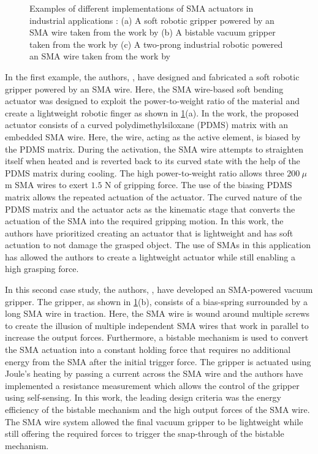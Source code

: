 \begin{figure}[h]
    \centering
    
    \caption[Examples of different implementations of SMA actuators in industrial applications]{Examples of different implementations of SMA actuators in industrial applications : (a) A soft robotic gripper powered by an SMA wire taken from the work by \cite{rodrigueCurvedShapeMemory2017a} (b) A bistable vacuum gripper taken from the work by \cite{motzkiEnergyefficientSMAVacuum2016} (c) A two-prong industrial robotic powered an SMA wire taken from the work by \cite{luNovelDesignParallel2019}}
    \label{fig:industrial-examples}
\end{figure}

In the first example, the authors, \cite{rodrigueCurvedShapeMemory2017a}, have designed and fabricated a soft robotic gripper powered by an SMA wire. Here, the SMA wire-based soft bending actuator was designed to exploit the power-to-weight ratio of the material and create a lightweight robotic finger as shown in \cref{fig:industrial-examples}(a). In the work, the proposed actuator consists of a curved polydimethylsiloxane (PDMS) matrix with an embedded SMA wire. Here, the wire, acting as the active element, is biased by the PDMS matrix. During the activation, the SMA wire attempts to straighten itself when heated and is reverted back to its curved state with the help of the PDMS matrix during cooling. The high power-to-weight ratio allows three $200~\mu$m SMA wires to exert $1.5$ N of gripping force. The use of the biasing PDMS matrix allows the repeated actuation of the actuator. The curved nature of the PDMS matrix and the actuator acts as the kinematic stage that converts the actuation of the SMA into the required gripping motion. In this work, the authors have prioritized creating an actuator that is lightweight and has soft actuation to not damage the grasped object. The use of SMAs in this application has allowed the authors to create a lightweight actuator while still enabling a high grasping force.

In this second case study, the authors, \cite{motzkiEnergyefficientSMAVacuum2016}, have developed an SMA-powered vacuum gripper. The gripper, as shown in \cref{fig:industrial-examples}(b), consists of a bias-spring surrounded by a long SMA wire in traction. Here, the SMA wire is wound around multiple screws to create the illusion of multiple independent SMA wires that work in parallel to increase the output forces. Furthermore, a bistable mechanism is used to convert the SMA actuation into a constant holding force that requires no additional energy from the SMA after the initial trigger force. The gripper is actuated using Joule's heating by passing a current across the SMA wire and the authors have implemented a resistance measurement which allows the control of the gripper using self-sensing. In this work, the leading design criteria was the energy efficiency of the bistable mechanism and the high output forces of the SMA wire. The SMA wire system allowed the final vacuum gripper to be lightweight while still offering the required forces to trigger the snap-through of the bistable mechanism.

